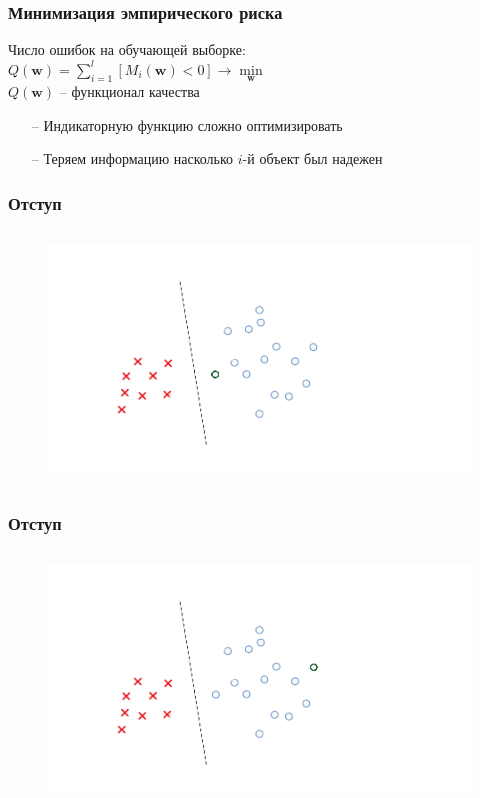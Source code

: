 \documentclass[12pt]{beamer}
\begin{document}
\begin{frame}\frametitle{Минимизация эмпирического риска}
Число ошибок на обучающей выборке:\\
\vspace{5mm}
${Q(\mathbf{w}) = \sum\limits_{i=1}^l \left[ M_i(\mathbf{w}) < 0 \right] \rightarrow \min\limits_{\mathbf{w}} }$\\
\vspace{3mm}
${Q(\mathbf{w})}$ -- функционал качества\\
\vspace{5mm}

\begin{itemize}
\item[--] Индикаторную функцию сложно оптимизировать
\item[--] Теряем информацию насколько ${i}$-й объект был надежен
\end{itemize}
\end{frame}

\begin{frame}\frametitle{Отступ}
\begin{figure}[htbp]
  \includegraphics[height=190pt, keepaspectratio = true]{images/margin1}
\end{figure}
\end{frame}

\begin{frame}\frametitle{Отступ}
\begin{figure}[htbp]
  \includegraphics[height=190pt, keepaspectratio = true]{images/margin2}
\end{figure}
\end{frame}
\end{document}
